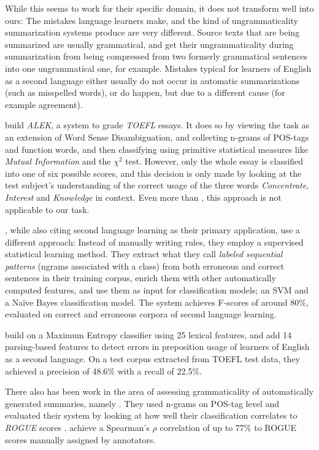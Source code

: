 \documentclass[a4paper,10pt]{scrartcl}
\theoremstyle{style}
\begin{document}
While this seems to work for their specific domain, it does not transform well into ours: The mistakes language learners make, and the kind of ungrammaticality summarization systems produce are very different. Source texts that are being summarized are usually grammatical, and get their ungrammaticality during summarization from being compressed from two formerly grammatical sentences into one ungrammatical one, for example. Mistakes typical for learners of English as a second language either usually do not occur in automatic summarizations (such as misspelled words), or do happen, but due to a different cause (for example agreement).

\cite{chodorow2000unsupervised} build \textit{ALEK}, a system to grade \textit{TOEFL} essays. It does so by viewing the task as an extension of Word Sense Disambiguation, and collecting n-grams of POS-tags and function words, and then classifying using primitive statistical measures like \textit{Mutual Information} and the $\chi^2$ test. However, only the whole essay is classified into one of six possible scores, and this decision is only made by looking at the test subject's understanding of the correct usage of the three words \textit{Concentrate}, \textit{Interest} and \textit{Knowledge} in context.
Even more than \cite{bender2004arboretum}, this approach is not applicable to our task.

\cite{sun2007detecting}, while also citing second language learning as their primary application, use a different approach: Instead of manually writing rules, they employ a supervised statistical learning method. They extract what they call \textit{labeled sequential patterns} (ngrams associated with a class) from both erroneous and correct sentences in their training corpus, enrich them with other automatically computed features, and use them as input for classification models; an SVM \citep[SVMlight,][]{Joachims/02a} and a Na\"ive Bayes classification model. The system achieves F-scores of around 80\%, evaluated on correct and erroneous corpora of second language learning.

\cite{tetreault2010using} build on a Maximum Entropy classifier using 25 lexical features, and add 14 parsing-based features to detect errors in preposition usage of learners of English as a second language. On a test corpus extracted from TOEFL test data, they achieved a precision of 48.6\% with a recall of 22.5\%.

There also has been work in the area of assessing grammaticality of automatically generated summaries, namely \cite{vadlapudi2010automated}. They used n-grams on POS-tag level and evaluated their system by looking at how well their classification correlates to \textit{ROGUE} scores \citep{lin2004rouge}. \citeauthor{vadlapudi2010automated} achieve a Spearman's $\rho{}$ correlation of up to 77\% to ROGUE scores manually assigned by annotators.
\end{document}
